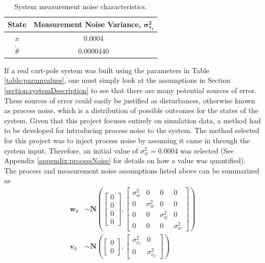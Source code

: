 \documentclass{article}
\newcommand{\matr}[1]{\bm{#1}}     %
\begin{document}
\begin{table}[h!]
 \centering
  \renewcommand{\arraystretch}{1.5}
 \begin{tabular}{ |c |c |}
 \hline
 	 \textbf{State} & \textbf{Measurement Noise Variance, }$\bm{\sigma_{v_i}^2}$  \\ \hline
 	 $x$ & 0.0004 \\ \hline
 	 $\dot{\theta}$ & 0.0000440 \\ \hline
 \end{tabular}
 \caption{System measurement noise characteristics.}
 \label{table:sensorNoise}
 \end{table}
If a real cart-pole system was built using the parameters in Table \ref{table:paramvalues}, one must simply look at the assumptions in Section \ref{section:systemDescription} to see that there are many potential sources of error. These sources of error could easily be justified as disturbances, otherwise known as process noise, which is a distribution of possible outcomes for the states of the system. Given that this project focuses entirely on simulation data, a method had to be developed for introducing process noise to the system. The method selected for this project was to inject process noise by assuming it came in through the system input. Therefore, an initial value of $\sigma_{w}^2=0.0004$ was selected (See Appendix \ref{appendix:processNoise} for details on how a value was quantified). \\
The process and measurement noise assumptions listed above can be summarized as
\begin{equation}
\begin{aligned}
\matr{w}_k &\sim \matr{N}\left(\begin{bmatrix}
0 \\
0 \\
0 \\
0
\end{bmatrix},\begin{bmatrix}
\sigma_w^2 & 0 & 0 & 0 \\
0 & \sigma_w^2 & 0 & 0 \\
0 & 0 & \sigma_w^2 & 0 \\
0 & 0 & 0 & \sigma_w^2
\end{bmatrix}\right) \\
\matr{v}_k &\sim \matr{N}\left(\begin{bmatrix}
0 \\
0
\end{bmatrix},\begin{bmatrix}
\sigma_{v_1}^2 & 0 \\
0 & \sigma_{v_2}^2 
\end{bmatrix}\right)
\end{aligned}
\end{equation}
\end{document}
